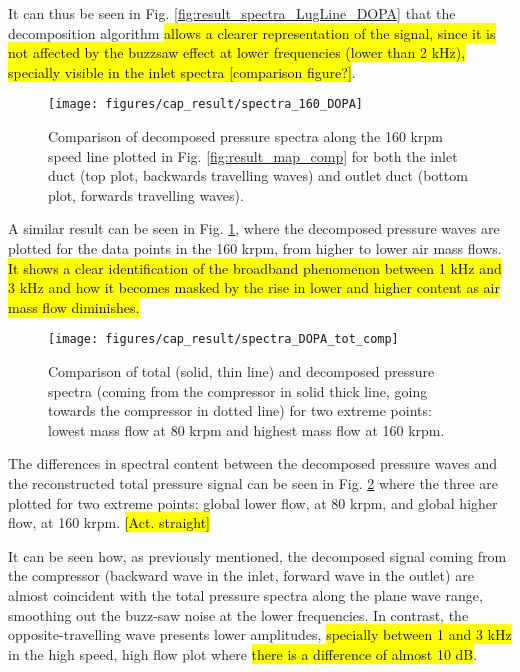 It can thus be seen in Fig. \ref{fig:result_spectra_LugLine_DOPA} that the decomposition algorithm \hl{allows a clearer representation of the signal, since it is not affected by the buzzsaw effect at lower frequencies (lower than 2 kHz), specially visible in the inlet spectra [comparison figure?]}.

\begin{figure}[tbh!]
\centering
\texttt{[image: figures/cap\_result/spectra\_160\_DOPA]}
\caption{Comparison of decomposed pressure spectra along the 160 krpm speed line plotted in Fig. \ref{fig:result_map_comp} for both the inlet duct (top plot, backwards travelling waves) and outlet duct (bottom plot, forwards travelling waves).}
\label{fig:result_spectra_160_DOPA}
\end{figure}

A similar result can be seen in Fig. \ref{fig:result_spectra_160_DOPA}, where the decomposed pressure waves are plotted for the data points in the 160 krpm, from higher to lower air mass flows. \hl{It shows a clear identification of the broadband phenomenon between 1 kHz and 3 kHz and how it becomes masked by the rise in lower and higher content as air mass flow diminishes.}

\begin{figure}[tbh!]
\centering
\texttt{[image: figures/cap\_result/spectra\_DOPA\_tot\_comp]}
\caption{Comparison of total (solid, thin line) and decomposed pressure spectra (coming from the compressor in solid thick line, going towards the compressor in dotted line) for two extreme points: lowest mass flow at 80 krpm and highest mass flow at 160 krpm.}
\label{fig:result_spectra_DOPA_tot_comp}
\end{figure}

The differences in spectral content between the decomposed pressure waves and the reconstructed total pressure signal can be seen in Fig. \ref{fig:result_spectra_DOPA_tot_comp} where the three are plotted for two extreme points: global lower flow, at 80 krpm, and global higher flow, at 160 krpm. \hl{[Act. straight]}

It can be seen how, as previously mentioned, the decomposed signal coming from the compressor (backward wave in the inlet, forward wave in the outlet) are almost coincident with the total pressure spectra along the plane wave range, smoothing out the buzz-saw noise at the lower frequencies. In contrast, the opposite-travelling wave presents lower amplitudes, \hl{specially between 1 and 3 kHz} in the high speed, high flow plot where \hl{there is a difference of almost 10 dB}.

